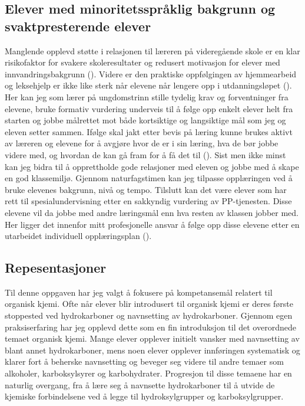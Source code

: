\documentclass[main.tex]{subfiles}
\begin{document}
\subsection*{Elever med minoritetsspråklig bakgrunn og svaktpresterende elever}

Manglende opplevd støtte i relasjonen til læreren på videregående skole er en klar risikofaktor for svakere skoleresultater og redusert motivasjon for elever med innvandringsbakgrunn (). Videre er den praktiske oppfølgingen av hjemmearbeid og leksehjelp er ikke like sterk når elevene når lengere opp i utdanningsløpet (). 
\newline\newline
Her kan jeg som lærer på ungdomstrinn stille tydelig krav og forventninger fra elevene, bruke formativ vurdering underveis til å følge opp enkelt elever helt fra starten og jobbe målrettet mot både kortsiktige og langsiktige mål som jeg og eleven setter sammen. Ifølge  skal jakt etter bevis på læring kunne brukes aktivt av læreren og elevene for å avgjøre hvor de er i sin læring, hva de bør jobbe videre med, og hvordan de kan gå fram for å få det til (). Sist men ikke minst kan jeg bidra til å opprettholde gode relasjoner med eleven og jobbe med å skape en god klassemiljø. Gjennom naturfagstimen kan jeg tilpasse opplæringen ved å bruke elevenes bakgrunn, nivå og tempo.
\newline\newline
Tilslutt kan det være elever som har rett til spesialundervisning etter en sakkyndig vurdering av PP-tjenesten. Disse elevene vil da jobbe med andre læringsmål enn hva resten av klassen jobber med. Her ligger det innenfor mitt profesjonelle ansvar å følge opp disse elevene etter en utarbeidet individuell opplæringsplan ().


\subsection*{Repesentasjoner}

Til denne oppgaven har jeg valgt å fokusere på kompetansemål relatert til organisk kjemi. Ofte når elever blir introdusert til organisk kjemi er deres første stoppested ved hydrokarboner og navnsetting av hydrokarboner. Gjennom egen praksiserfaring har jeg opplevd dette som en fin introduksjon til det overordnede temaet organisk kjemi. Mange elever opplever initielt vansker med navnsetting av blant annet hydrokarboner, mens noen elever opplever innføringen systematisk og klarer fort å beherske navnsetting og beveger seg videre til andre temaer som alkoholer, karboksylsyrer og karbohydrater. Progresjon til disse temaene har en naturlig overgang, fra å lære seg å navnsette hydrokarboner til å utvide de kjemiske forbindelsene ved å legge til hydroksylgrupper og karboksylgrupper. \newline
\end{document}
